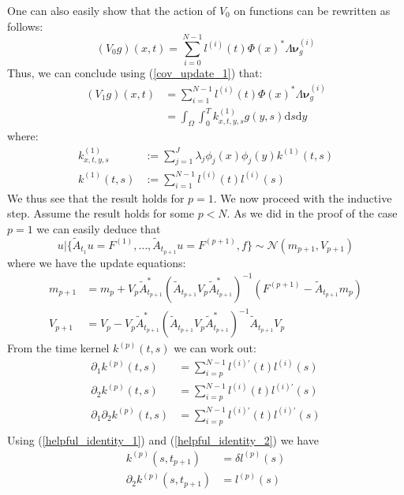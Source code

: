 \documentclass{article}
\theoremstyle{definition}
\theoremstyle{remark}
\theoremstyle{remark}
\begin{document}
\noindent One can also easily show that the action of $V_{0}$ on functions can be rewritten as follows:
\begin{equation}
    (V_{0}g)(x,t) = \sum_{i=0}^{N-1}l^{(i)}(t)\Phi(x)^{*}\Lambda\boldsymbol{\nu}_{g}^{(i)}
\end{equation}
Thus, we can conclude using (\ref{cov_update_1}) that:
\begin{align}
    (V_{1}g)(x,t) &= \sum_{i=1}^{N-1}l^{(i)}(t)\Phi(x)^{*}\Lambda\boldsymbol{\nu}_{g}^{(i)} \nonumber \\
    &=\int_{\Omega}\int_{0}^{T}k^{(1)}_{x,t,y,s}g(y,s)\mathrm{d}s\mathrm{d}y
\end{align}
where:
\begin{align}
    k^{(1)}_{x,t,y,s} &:= \sum_{j=1}^{J}\lambda_{j}\phi_{j}(x)\phi_{j}(y)k^{(1)}(t,s) \\
    k^{(1)}(t,s) &:= \sum_{i=1}^{N-1}l^{(i)}(t)l^{(i)}(s)
\end{align}
We thus see that the result holds for $p=1$. We now proceed with the inductive step. Assume the result holds for some $p<N$. As we did in the proof of the case $p=1$ we can easily deduce that
\begin{equation}
    u|\{\tilde{A}_{t_1}u=F^{(1)},\dots,\tilde{A}_{t_{p+1}}u=F^{(p+1)},f\}\sim\mathcal{N}(m_{p+1},V_{p+1})
\end{equation}
where we have the update equations:
\begin{align}
    \label{mean_update_p}
    m_{p+1}&=m_{p}+V_{p}\tilde{A}_{t_{p+1}}^{*}(\tilde{A}_{t_{p+1}}V_{p}\tilde{A}_{t_{p+1}}^{*})^{-1}(F^{(p+1)}-\tilde{A}_{t_{p+1}}m_{p}) \\
    \label{cov_update_p}
    V_{p+1}&=V_{p}-V_{p}\tilde{A}_{t_{p+1}}^{*}(\tilde{A}_{t_{p+1}}V_{p}\tilde{A}_{t_{p+1}}^{*})^{-1}\tilde{A}_{t_{p+1}}V_{p}
\end{align}
From the time kernel $k^{(p)}(t,s)$ we can work out:
\begin{align}
    \partial_{1}k^{(p)}(t,s) &= \sum_{i=p}^{N-1}l^{(i)\prime}(t)l^{(i)}(s) \\
    \partial_{2}k^{(p)}(t,s) &= \sum_{i=p}^{N-1}l^{(i)}(t)l^{(i)\prime}(s) \\
    \partial_{1}\partial_{2}k^{(p)}(t,s) &= \sum_{i=p}^{N-1}l^{(i)\prime}(t)l^{(i)\prime}(s) \\
\end{align}
Using (\ref{helpful_identity_1}) and (\ref{helpful_identity_2}) we have
\begin{align}
    k^{(p)}(s,t_{p+1}) &= \delta l^{(p)}(s) \\
    \partial_{2}k^{(p)}(s,t_{p+1}) &= l^{(p)}(s)
\end{align}
\end{document}
